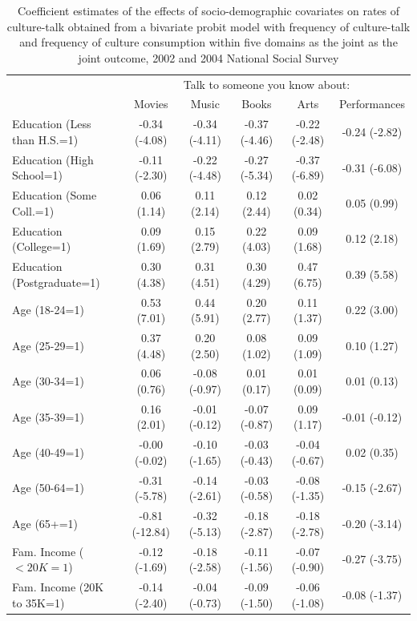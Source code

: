 \documentclass[11pt]{article}
\begin{document}
\begin{landscape}
\begin{table}[t]
\caption{Coefficient estimates of the effects of socio-demographic covariates on rates of culture-talk obtained from a bivariate probit model with frequency of culture-talk and frequency of culture consumption within five domains as the joint as the joint outcome, 2002 and 2004 National Social Survey}
\begin{tabular*}{\hsize}{@{\extracolsep{\fill}} l*{5}{c}}
\hline
\hline
&\multicolumn{5}{c}{Talk to someone you know about:}\\
&Movies&Music&Books&Arts&Performances\\
\hline
Education (Less than H.S.=1)  &-0.34 (-4.08)&-0.34 (-4.11)&-0.37 (-4.46)&-0.22 (-2.48)&-0.24 (-2.82)\\
Education (High School=1)     &-0.11 (-2.30)&-0.22 (-4.48)&-0.27 (-5.34)&-0.37 (-6.89)&-0.31 (-6.08)\\
Education (Some Coll.=1)      &0.06 (1.14)&0.11 (2.14)&0.12 (2.44)&0.02 (0.34)&0.05 (0.99)\\
Education (College=1)         &0.09 (1.69)&0.15 (2.79)&0.22 (4.03)&0.09 (1.68)&0.12 (2.18)\\
Education (Postgraduate=1)    &0.30 (4.38)&0.31 (4.51)&0.30 (4.29)&0.47 (6.75)&0.39 (5.58)\\
Age (18-24=1)                 &0.53 (7.01)&0.44 (5.91)&0.20 (2.77)&0.11 (1.37)&0.22 (3.00)\\
Age (25-29=1)                 &0.37 (4.48)&0.20 (2.50)&0.08 (1.02)&0.09 (1.09)&0.10 (1.27)\\
Age (30-34=1)                 &0.06 (0.76)&-0.08 (-0.97)&0.01 (0.17)&0.01 (0.09)&0.01 (0.13)\\
Age (35-39=1)                 &0.16 (2.01)&-0.01 (-0.12)&-0.07 (-0.87)&0.09 (1.17)&-0.01 (-0.12)\\
Age (40-49=1)                 &-0.00 (-0.02)&-0.10 (-1.65)&-0.03 (-0.43)&-0.04 (-0.67)&0.02 (0.35)\\
Age (50-64=1)                 &-0.31 (-5.78)&-0.14 (-2.61)&-0.03 (-0.58)&-0.08 (-1.35)&-0.15 (-2.67)\\
Age (65+=1)                   &-0.81 (-12.84)&-0.32 (-5.13)&-0.18 (-2.87)&-0.18 (-2.78)&-0.20 (-3.14)\\
Fam. Income ($<20K=1$)          &-0.12 (-1.69)&-0.18 (-2.58)&-0.11 (-1.56)&-0.07 (-0.90)&-0.27 (-3.75)\\
Fam. Income (20K to 35K=1)   &-0.14 (-2.40)&-0.04 (-0.73)&-0.09 (-1.50)&-0.06 (-1.08)&-0.08 (-1.37)\\

\end{tabular*}
\end{table}
\end{landscape}
\end{document}
